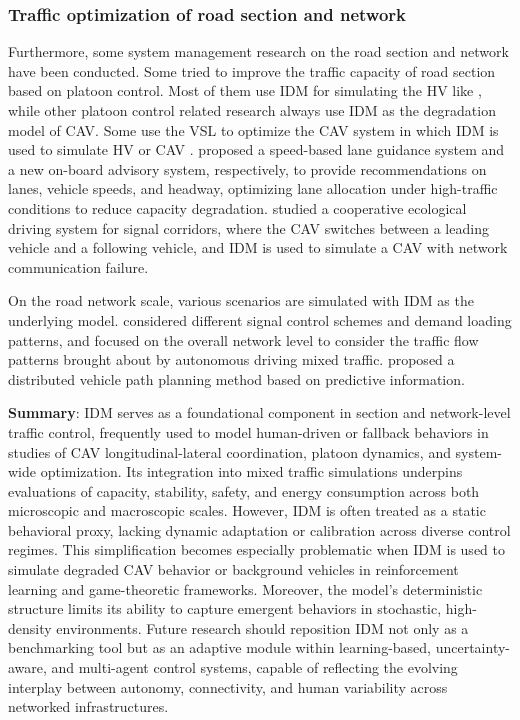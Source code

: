 \documentclass[a4paper,fleqn]{cas-sc}
\begin{document}
\subsubsection{Traffic optimization of road section and network}

Furthermore, some system management research on the road section and network have been conducted. Some tried to improve the traffic capacity of road section based on platoon control.  Most of them use IDM for simulating the HV like \cite{ferreira_impact_2012,ge_optimal_2017,heEcoDrivingAdvisoryStrategiesPlatoon2018a,liu_joint_2022,montaninoTrajectoryDataReconstructionSimulationBased2015b,wangRollingHorizonControlFramework2014b,wang_optimal_2022,wang_trajectory_2022}, while other platoon control related research always use IDM as the degradation model of CAV. Some use the VSL to optimize the CAV system in which IDM is used to simulate HV or CAV \citep{khondakerVariableSpeedLimitMicroscopic2015a,li_developing_2022,li_integrated_2017,luTD3LVSLLaneLevelVariableSpeed2023a,othman_analysis_2022}. \cite{mahajan_improving_2024,schakel_improving_2014} proposed a speed-based lane guidance system and a new on-board advisory system, respectively, to provide recommendations on lanes, vehicle speeds, and headway, optimizing lane allocation under high-traffic conditions to reduce capacity degradation. \cite{wang_cooperative_2020} studied a cooperative ecological driving system for signal corridors, where the CAV switches between a leading vehicle and a following vehicle, and IDM is used to simulate a CAV with network communication failure.

On the road network scale, various scenarios are simulated with IDM as the underlying model. \cite{huang_characterizing_2023} considered different signal control schemes and demand loading patterns, and focused on the overall network level to consider the traffic flow patterns brought about by autonomous driving mixed traffic. \cite{claes_decentralized_2011} proposed a distributed vehicle path planning method based on predictive information.

\textbf{Summary}: IDM serves as a foundational component in section and network-level traffic control, frequently used to model human-driven or fallback behaviors in studies of CAV longitudinal-lateral coordination, platoon dynamics, and system-wide optimization. Its integration into mixed traffic simulations underpins evaluations of capacity, stability, safety, and energy consumption across both microscopic and macroscopic scales. However, IDM is often treated as a static behavioral proxy, lacking dynamic adaptation or calibration across diverse control regimes. This simplification becomes especially problematic when IDM is used to simulate degraded CAV behavior or background vehicles in reinforcement learning and game-theoretic frameworks. Moreover, the model’s deterministic structure limits its ability to capture emergent behaviors in stochastic, high-density environments. Future research should reposition IDM not only as a benchmarking tool but as an adaptive module within learning-based, uncertainty-aware, and multi-agent control systems, capable of reflecting the evolving interplay between autonomy, connectivity, and human variability across networked infrastructures.
\end{document}
